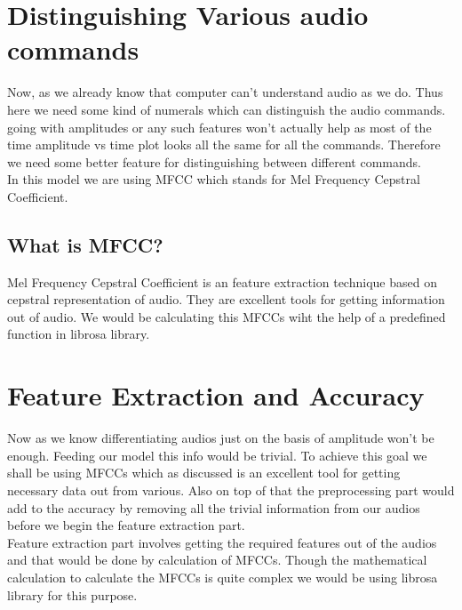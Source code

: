 \documentclass{article}
\begin{document}
\section*{Distinguishing Various audio commands}
Now, as we already know that computer can't understand audio as we do. Thus here we need some kind of numerals which can distinguish the audio commands. going with amplitudes or any such features won't actually help as most of the time amplitude vs time plot looks all the same for all the commands. 
Therefore we need some better feature for distinguishing between different commands.\\
In this model we are using MFCC which stands for Mel Frequency Cepstral Coefficient. 
\subsection*{What is MFCC?}
Mel Frequency Cepstral Coefficient is an feature extraction technique based on cepstral representation of audio. They are excellent tools for getting information out of audio. We would be calculating this MFCCs wiht the help of a predefined function in librosa library.
\section*{Feature Extraction and Accuracy}
Now as we know differentiating audios just on the basis of amplitude won't be enough. Feeding our model this info would be trivial. To achieve this goal we shall be using MFCCs which as discussed is an excellent tool for getting necessary data out  from various. Also on top of that the preprocessing part would add to the accuracy by removing all the trivial information from our audios before we begin the feature extraction part.\\
    Feature extraction part involves getting the required features out of the audios and that would be done by calculation of MFCCs. Though the mathematical calculation to calculate the MFCCs is quite complex we would be using librosa library for this purpose.

    
\newpage
\end{document}
